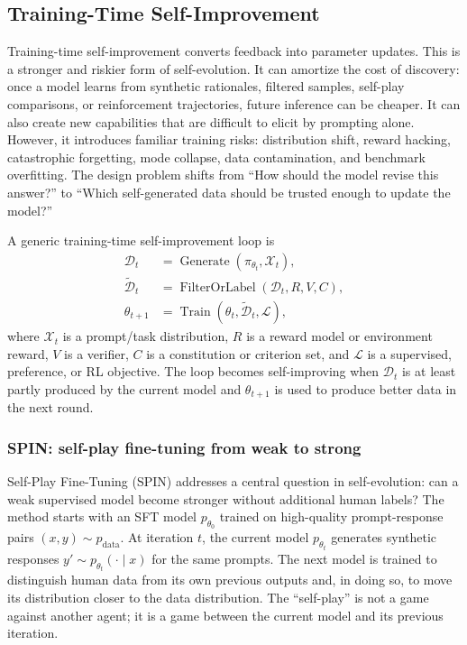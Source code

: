 \subsection{Training-Time Self-Improvement}
\label{subsec:training-time-self-improvement}

Training-time self-improvement converts feedback into parameter updates. This is a stronger and riskier form of self-evolution. It can amortize the cost of discovery: once a model learns from synthetic rationales, filtered samples, self-play comparisons, or reinforcement trajectories, future inference can be cheaper. It can also create new capabilities that are difficult to elicit by prompting alone. However, it introduces familiar training risks: distribution shift, reward hacking, catastrophic forgetting, mode collapse, data contamination, and benchmark overfitting. The design problem shifts from ``How should the model revise this answer?'' to ``Which self-generated data should be trusted enough to update the model?''

A generic training-time self-improvement loop is
\begin{align}
    \mathcal{D}_t &= \operatorname{Generate}(\pi_{\theta_t}, \mathcal{X}_t),\\
    \tilde{\mathcal{D}}_t &= \operatorname{FilterOrLabel}(\mathcal{D}_t, R, V, C),\\
    \theta_{t+1} &= \operatorname{Train}(\theta_t, \tilde{\mathcal{D}}_t, \mathcal{L}),
    \label{eq:training-loop}
\end{align}
where $\mathcal{X}_t$ is a prompt/task distribution, $R$ is a reward model or environment reward, $V$ is a verifier, $C$ is a constitution or criterion set, and $\mathcal{L}$ is a supervised, preference, or RL objective. The loop becomes self-improving when $\mathcal{D}_t$ is at least partly produced by the current model and $\theta_{t+1}$ is used to produce better data in the next round.

\subsubsection{SPIN: self-play fine-tuning from weak to strong}
\label{subsubsec:spin}

Self-Play Fine-Tuning (SPIN) addresses a central question in self-evolution: can a weak supervised model become stronger without additional human labels? The method starts with an SFT model $p_{\theta_0}$ trained on high-quality prompt-response pairs $(x,y)\sim p_{\mathrm{data}}$. At iteration $t$, the current model $p_{\theta_t}$ generates synthetic responses $y'\sim p_{\theta_t}(\cdot\mid x)$ for the same prompts. The next model is trained to distinguish human data from its own previous outputs and, in doing so, to move its distribution closer to the data distribution. The ``self-play'' is not a game against another agent; it is a game between the current model and its previous iteration.


